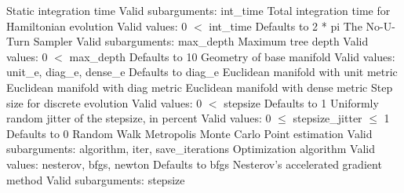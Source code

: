 \begin{description}
%
            {Static integration time}
            {Valid subarguments: int\_time}
%
              {Total integration time for Hamiltonian evolution}
              {Valid values: 0 $<$ int\_time}
              {Defaults to 2 * pi}
%
            {The No-U-Turn Sampler}
            {Valid subarguments: max\_depth}
%
              {Maximum tree depth}
              {Valid values: 0 $<$ max\_depth}
              {Defaults to 10}
%
          {Geometry of base manifold}
          {Valid values: unit\_e, diag\_e, dense\_e}
          {Defaults to diag\_e}
%
            {Euclidean manifold with unit metric}
%
            {Euclidean manifold with diag metric}
%
            {Euclidean manifold with dense metric}
%
          {Step size for discrete evolution}
          {Valid values: 0 $<$ stepsize}
          {Defaults to 1}
%
          {Uniformly random jitter of the stepsize, in percent}
          {Valid values: 0 $\le$ stepsize\_jitter $\le$ 1}
          {Defaults to 0}
%
        {Random Walk Metropolis Monte Carlo}
%
    {Point estimation}
    {Valid subarguments: algorithm, iter, save\_iterations}
%
      {Optimization algorithm}
      {Valid values: nesterov, bfgs, newton}
      {Defaults to bfgs}
%
        {Nesterov's accelerated gradient method}
        {Valid subarguments: stepsize}
%

\end{description}
